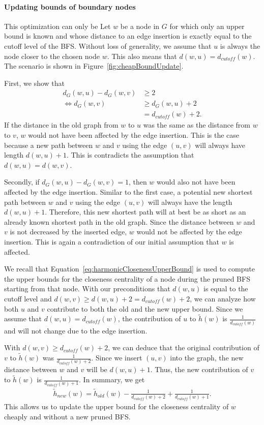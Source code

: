 \paragraph{Updating bounds of boundary nodes}
This optimization can only be Let $w$ be a node in $G$ for which only an upper bound is known and whose distance to an edge insertion is exactly equal to the cutoff level of the BFS. Without loss of generality, we assume that $u$ is always the node closer to the chosen node $w$. This also means that $d(w, u) = d_{cutoff}(w)$. The scenario is shown in Figure~\ref{fig:cheapBoundUpdate}.

First, we show that
\begin{align*}
	 d_G(w, u) - d_G(w, v) &\geq 2 \\
	\iff  d_G(w, v) &\geq d_G(w, u) + 2 \\
	                &= d_{cutoff}(w) + 2.
\end{align*}
If the distance in the old graph from $w$ to $u$ was the same as the distance from $w$ to $v$, $w$ would not have been affected by the edge insertion. This is the case because a new path between $w$ and $v$ using the edge $(u, v)$ will always have length $d(w, u) + 1$. This is contradicts the assumption that $d(w, u) = d(w, v)$.

Secondly, if $d_G(w, u) - d_G(w, v) = 1$, then $w$ would also not have been affected by the edge insertion. Similar to the first case, a potential new shortest path between $w$ and $v$ using the edge $(u, v)$ will always have the length $d(w, u) + 1$. Therefore, this new shortest path will at best be as short as an already known shortest path in the old graph. Since the distance between $w$ and $v$ is not decreased by the inserted edge, $w$ would not be affected by the edge insertion. This is again a contradiction of our initial assumption that $w$ is affected.

We recall that Equation~\ref{eq:harmonicClosenessUpperBound} is used to compute the upper bounds for the closeness centrality of a node during the pruned BFS starting from that node. With our preconditions that $d(w, u)$ is equal to the cutoff level and $d(w, v) \geq d(w, u) + 2 = d_{cutoff}(w) + 2 $, we can analyze how both $u$ and $v$ contribute to both the old and the new upper bound. Since we assume that $d(w, u) = d_{cutoff}(w)$, the contribution of $u$ to $\widetilde{h}(w)$ is $\frac{1}{d_{cutoff}(w)}$ and will not change due to the edge insertion.

With $d(w, v) \geq d_{cutoff}(w) + 2$, we can deduce that the original contribution of $v$ to $\widetilde{h}(w)$ was $\frac{1}{d_{cutoff}(w) + 2}$. Since we insert $(u, v)$ into the graph, the new distance between $w$ and $v$ will be $d(w, u) + 1$. Thus, the new contribution of $v$ to $\widetilde{h}(w)$ is $\frac{1}{d_{cutoff}(w) + 1}$. In summary, we get
\begin{align}
	\widetilde{h}_{new}(w) = \widetilde{h}_{old}(w) - \frac{1}{d_{cutoff}(w) + 2} + \frac{1}{d_{cutoff}(w) + 1}.
\end{align}
This allows us to update the upper bound for the closeness centrality of $w$ cheaply and without a new pruned BFS.


